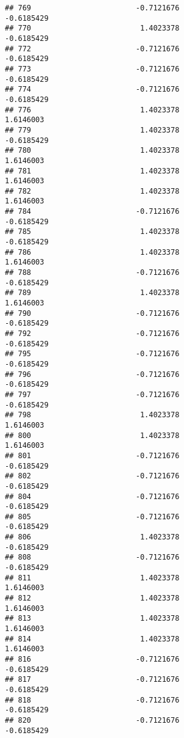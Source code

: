 \documentclass[
]{article}
\begin{document}
\begin{verbatim}
## 769                        -0.7121676                       -0.6185429
## 770                         1.4023378                       -0.6185429
## 772                        -0.7121676                       -0.6185429
## 773                        -0.7121676                       -0.6185429
## 774                        -0.7121676                       -0.6185429
## 776                         1.4023378                        1.6146003
## 779                         1.4023378                       -0.6185429
## 780                         1.4023378                        1.6146003
## 781                         1.4023378                        1.6146003
## 782                         1.4023378                        1.6146003
## 784                        -0.7121676                       -0.6185429
## 785                         1.4023378                       -0.6185429
## 786                         1.4023378                        1.6146003
## 788                        -0.7121676                       -0.6185429
## 789                         1.4023378                        1.6146003
## 790                        -0.7121676                       -0.6185429
## 792                        -0.7121676                       -0.6185429
## 795                        -0.7121676                       -0.6185429
## 796                        -0.7121676                       -0.6185429
## 797                        -0.7121676                       -0.6185429
## 798                         1.4023378                        1.6146003
## 800                         1.4023378                        1.6146003
## 801                        -0.7121676                       -0.6185429
## 802                        -0.7121676                       -0.6185429
## 804                        -0.7121676                       -0.6185429
## 805                        -0.7121676                       -0.6185429
## 806                         1.4023378                       -0.6185429
## 808                        -0.7121676                       -0.6185429
## 811                         1.4023378                        1.6146003
## 812                         1.4023378                        1.6146003
## 813                         1.4023378                        1.6146003
## 814                         1.4023378                        1.6146003
## 816                        -0.7121676                       -0.6185429
## 817                        -0.7121676                       -0.6185429
## 818                        -0.7121676                       -0.6185429
## 820                        -0.7121676                       -0.6185429

\end{verbatim}
\end{document}
